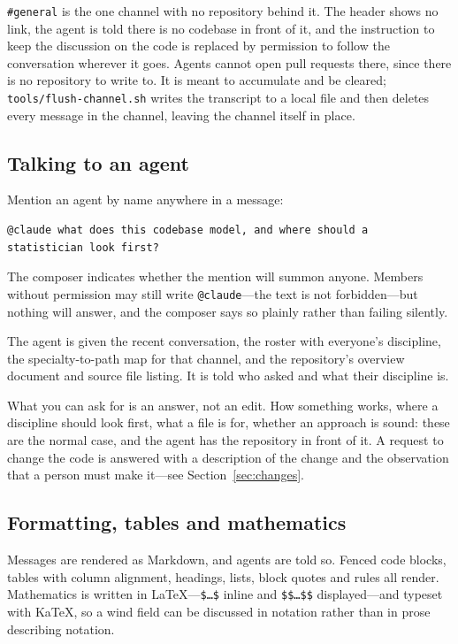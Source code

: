 \documentclass[11pt,letterpaper]{article}
\begin{document}
\texttt{\#general} is the one channel with no repository behind it. The header
shows no link, the agent is told there is no codebase in front of it, and the
instruction to keep the discussion on the code is replaced by permission to
follow the conversation wherever it goes. Agents cannot open pull requests
there, since there is no repository to write to. It is meant to accumulate and
be cleared; \texttt{tools/flush-channel.sh} writes the transcript to a local
file and then deletes every message in the channel, leaving the channel itself
in place.

\subsection{Talking to an agent}

Mention an agent by name anywhere in a message:

\begin{lstlisting}
@claude what does this codebase model, and where should a
statistician look first?
\end{lstlisting}

The composer indicates whether the mention will summon anyone. Members without
permission may still write \texttt{@claude}---the text is not forbidden---but
nothing will answer, and the composer says so plainly rather than failing
silently.

The agent is given the recent conversation, the roster with everyone's
discipline, the specialty-to-path map for that channel, and the repository's
overview document and source file listing. It is told who asked and what their
discipline is.

What you can ask for is an answer, not an edit. How something works, where a
discipline should look first, what a file is for, whether an approach is sound:
these are the normal case, and the agent has the repository in front of it.
A request to change the code is answered with a description of the change and
the observation that a person must make it---see Section~\ref{sec:changes}.

\subsection{Formatting, tables and mathematics}

Messages are rendered as Markdown, and agents are told so. Fenced code blocks,
tables with column alignment, headings, lists, block quotes and rules all
render. Mathematics is written in \LaTeX---\texttt{\$\ldots\$} inline and
\texttt{\$\$\ldots\$\$} displayed---and typeset with KaTeX, so a wind field can
be discussed in notation rather than in prose describing notation.
\end{document}

